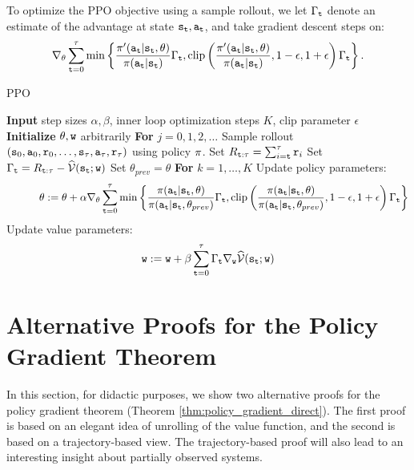To optimize the PPO objective using a sample rollout, we let $\Gamma_{\tt t}$ denote an estimate of the advantage at state ${\tt s}_{\tt t}, {\tt a}_{\tt t}$, and take gradient descent steps on:
\begin{equation*}
    \nabla_{\theta}\sum_{{\tt t}=0}^\tau \min \left\{\frac{\pi'({\tt a}_{\tt t}|{\tt s}_{\tt t}, \theta)}{\pi({\tt a}_{\tt t}|{\tt s}_{\tt t})}\Gamma_{\tt t},  \textrm{clip}\left(\frac{\pi'({\tt a}_{\tt t}|{\tt s}_{\tt t}, \theta)}{\pi({\tt a}_{\tt t}|{\tt s}_{\tt t})} , 1-\epsilon, 1+\epsilon\right)\Gamma_{\tt t} \right\}.
\end{equation*}

\begin{algorithm}[H]
\caption{PPO}
\begin{algorithmic}[1]
\State \textbf{Input} step sizes $\alpha,\beta$, inner loop optimization steps $K$, clip parameter $\epsilon$
\State \textbf{Initialize} $\theta, {\tt w}$ arbitrarily
\State \textbf{For} $j = 0,1,2,\dots$
\State \quad Sample rollout $({\tt s}_0, {\tt a}_0, {\tt r}_0, \ldots, {\tt s}_\tau, {\tt a}_\tau, {\tt r}_\tau)$ using policy $\pi$.
\State \quad Set $R_{{\tt t}:\tau} = \sum_{i={\tt t}}^\tau {\tt r}_i$
\State \quad Set $\Gamma_{\tt t} = R_{{\tt t}:\tau}-\widehat{\mathcal{V}}({\tt s}_{\tt t};{\tt w})$
\State \quad Set $\theta_{prev} = \theta$
\State \quad \textbf{For} $k=1,\dots,K$
\State \quad \quad \quad Update policy parameters:
\[
\quad \quad \quad \theta := \theta + \alpha \nabla_{\theta}\sum_{{\tt t}=0}^\tau \min \left\{\frac{\pi({\tt a}_{\tt t}|{\tt s}_{\tt t}, \theta)}{\pi({\tt a}_{\tt t}|{\tt s}_{\tt t}, \theta_{prev})}\Gamma_{\tt t},  \textrm{clip}\left(\frac{\pi({\tt a}_{\tt t}|{\tt s}_{\tt t}, \theta)}{\pi({\tt a}_{\tt t}|{\tt s}_{\tt t}, \theta_{prev})} , 1-\epsilon, 1+\epsilon\right)\Gamma_{\tt t} \right\}
\]
\State \quad Update value parameters:
\[
{\tt w} := {\tt w} + \beta \sum_{{\tt t}=0}^{\tau} \Gamma_{\tt t} \nabla_{{\tt w}} \widehat{\mathcal{V}}({\tt s}_{\tt t};{\tt w})
\]
\end{algorithmic}
\end{algorithm}

\section{Alternative Proofs for the Policy Gradient Theorem}\label{sec:alternative_proof}
In this section, for didactic purposes, we show two alternative proofs for the policy gradient theorem (Theorem \ref{thm:policy_gradient_direct}). The first proof is based on an elegant idea of unrolling of the value function, and the second is based on a trajectory-based view. The trajectory-based proof will also lead to an interesting insight about partially observed systems.

